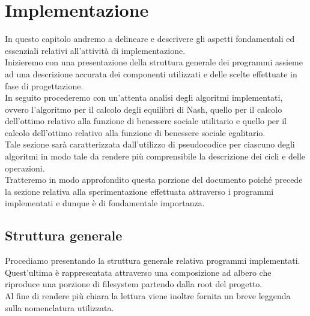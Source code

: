 \chapter{Implementazione}

In questo capitolo andremo a delineare e descrivere gli aspetti fondamentali ed essenziali relativi all'attività di implementazione.\\

Inizieremo con una presentazione della struttura generale dei programmi assieme ad una descrizione accurata dei componenti utilizzati e delle scelte effettuate in fase di progettazione.\\

In seguito procederemo con un'attenta analisi degli algoritmi implementati, ovvero l'algoritmo per il calcolo degli equilibri di Nash, quello per il calcolo dell'ottimo relativo alla funzione di benessere sociale utilitario e quello per il calcolo dell'ottimo relativo alla funzione di benessere sociale egalitario.\\
Tale sezione sarà caratterizzata dall'utilizzo di pseudocodice per ciascuno degli algoritmi in modo tale da rendere più comprensibile la descrizione dei cicli e delle operazioni.\\

Tratteremo in modo approfondito questa porzione del documento poiché precede la sezione relativa alla sperimentazione effettuata attraverso i programmi implementati e dunque è di fondamentale importanza.\\

\section{Struttura generale}
\justify

Procediamo presentando la struttura generale relativa programmi implementati.\\ 
Quest'ultima è rappresentata attraverso una composizione ad albero che riproduce una porzione di filesystem partendo dalla root del progetto.\\
Al fine di rendere più chiara la lettura viene inoltre fornita un breve leggenda sulla nomenclatura utilizzata.

